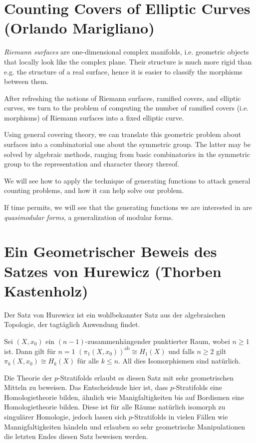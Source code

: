 \tableofcontents

\clearpage

\section{Counting Covers of Elliptic Curves (Orlando Marigliano)}

\emph{Riemann surfaces} are one-dimensional complex manifolds, i.e.
geometric objects that locally look like the complex plane. Their structure
is much more rigid than e.g. the structure of a real surface, hence it is
easier to classify the morphisms between them.

After refreshing the notions of Riemann surfaces, ramified covers, and
elliptic curves, we turn to the problem of computing the number of ramified
covers (i.e. morphisms) of Riemann surfaces into a fixed elliptic curve.

Using general covering theory, we can translate this geometric problem about
surfaces into
a combinatorial one about the symmetric group. The latter may be solved by
algebraic methods, ranging from basic
combinatorics in the symmetric group to the representation and character
theory thereof.

We will see how to apply the technique of generating functions to attack
general counting problems, and how it can help solve our problem.

If time permits, we will see that the generating functions we are interested
in are \emph{quasimodular forms}, a generalization of modular forms.

\section{Ein Geometrischer Beweis des Satzes von Hurewicz
(Thorben Kastenholz)}

Der Satz von Hurewicz ist ein wohlbekannter Satz aus der algebraischen
Topologie, der tagtäglich Anwendung findet.

\begin{satz}
Sei $(X,x_0)$ ein $(n-1)$-zusammenhängender punktierter Raum, wobei $n\geq 1$
ist. Dann gilt für $n=1$ $(\pi_1(X,x_0))^{\mathrm{ab}} \cong H_1(X)$ und falls
$n \geq 2$ gilt $\pi_k(X,x_0) \cong H_k(X)$ für alle $k\leq n$. All dies
Isomorphismen sind natürlich.
\end{satz}

Die Theorie der $p$-Stratifolds erlaubt es diesen Satz mit sehr geometrischen
Mitteln zu beweisen. Das Entscheidende hier ist, dass $p$-Stratifolds eine
Homologietheorie bilden, ähnlich wie Manigfaltigkeiten bis auf Bordismen eine
Homologietheorie bilden. Diese ist für alle Räume natürlich isomorph zu
singulärer Homologie, jedoch lassen sich $p$-Stratifolds in vielen Fällen wie
Mannigfaltigkeiten händeln und erlauben so sehr geometrische Manipulationen
die letzten Endes diesen Satz beweisen werden.

